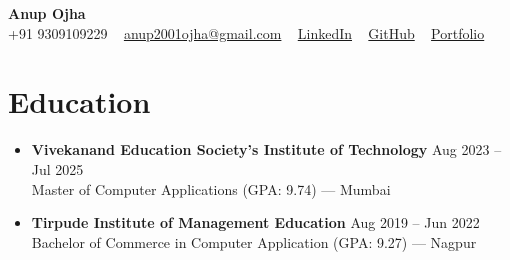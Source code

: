 \documentclass[a4paper,11pt]{article}
\begin{document}
\begin{center}
    {\LARGE \bfseries Anup Ojha} \\[2pt]
    \small 
    +91 9309109229 ~
    \href{mailto:anup2001ojha@gmail.com}{anup2001ojha@gmail.com} ~
    \href{https://linkedin.com/in/anup-ojha-11819b217/}{LinkedIn} ~
    \href{https://github.com/Anup-Ojha}{GitHub} ~
    \href{https://anup-ojha-dev-folio.vercel.app/}{Portfolio}
\end{center}

\vspace{-6pt}

\section{Education}
\begin{itemize}
    \item \textbf{Vivekanand Education Society's Institute of Technology} \hfill Aug 2023 -- Jul 2025 \\
    Master of Computer Applications (GPA: 9.74) --- Mumbai
    \item \textbf{Tirpude Institute of Management Education} \hfill Aug 2019 -- Jun 2022 \\
    Bachelor of Commerce in Computer Application (GPA: 9.27) --- Nagpur
\end{itemize}

\end{document}
